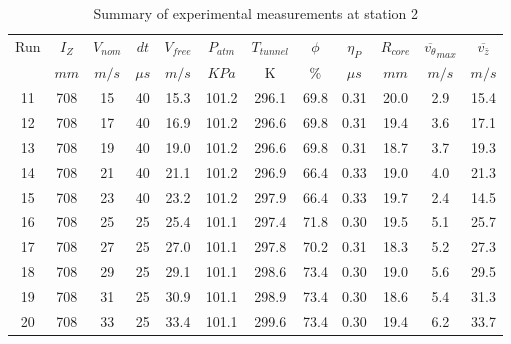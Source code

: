 \begin{table}[H]
\begin{center}
\begin{tabular}{|cccccccccccc|}
	\hline
	Run & $I_Z$ & $V_{nom}$ & $dt$ & $V_{free}$ & $P_{atm}$ & $T_{tunnel}$ & $\phi$ & $\eta_P$ & $R_{core}$ & $\overline{v_{\theta}}_{max}$ & $\overline{v_{\bar{z}}}$\\
	  & $mm$ & $m/s$ & $\mu s$ & $m/s$ & $KPa$ & K & $\%$ & $\mu s$ & $mm$ & $m/s$ & $m/s$\\
	\hline
	11 & 708 & 15 & 40 & 15.3 & 101.2 & 296.1 & 69.8 & 0.31 & 20.0 & 2.9 & 15.4\\
	12 & 708 & 17 & 40 & 16.9 & 101.2 & 296.6 & 69.8 & 0.31 & 19.4 & 3.6 & 17.1\\
	13 & 708 & 19 & 40 & 19.0 & 101.2 & 296.6 & 69.8 & 0.31 & 18.7 & 3.7 & 19.3\\
	14 & 708 & 21 & 40 & 21.1 & 101.2 & 296.9 & 66.4 & 0.33 & 19.0 & 4.0 & 21.3\\
	15 & 708 & 23 & 40 & 23.2 & 101.2 & 297.9 & 66.4 & 0.33 & 19.7 & 2.4 & 14.5\\
	16 & 708 & 25 & 25 & 25.4 & 101.1 & 297.4 & 71.8 & 0.30 & 19.5 & 5.1 & 25.7\\
	17 & 708 & 27 & 25 & 27.0 & 101.1 & 297.8 & 70.2 & 0.31 & 18.3 & 5.2 & 27.3\\
	18 & 708 & 29 & 25 & 29.1 & 101.1 & 298.6 & 73.4 & 0.30 & 19.0 & 5.6 & 29.5\\
	19 & 708 & 31 & 25 & 30.9 & 101.1 & 298.9 & 73.4 & 0.30 & 18.6 & 5.4 & 31.3\\
	20 & 708 & 33 & 25 & 33.4 & 101.1 & 299.6 & 73.4 & 0.30 & 19.4 & 6.2 & 33.7\\
	\hline
\end{tabular}
\caption{Summary of experimental measurements at station 2}
\label{table:experiment_results_2}
\end{center}
\end{table}
